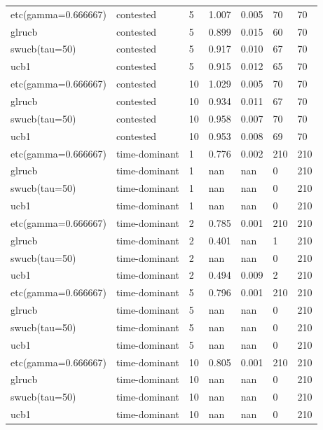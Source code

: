 \begin{tabular}{lllllll}
etc(gamma=0.666667) & contested & 5 & 1.007 & 0.005 & 70 & 70 \\
glrucb & contested & 5 & 0.899 & 0.015 & 60 & 70 \\
swucb(tau=50) & contested & 5 & 0.917 & 0.010 & 67 & 70 \\
ucb1 & contested & 5 & 0.915 & 0.012 & 65 & 70 \\
etc(gamma=0.666667) & contested & 10 & 1.029 & 0.005 & 70 & 70 \\
glrucb & contested & 10 & 0.934 & 0.011 & 67 & 70 \\
swucb(tau=50) & contested & 10 & 0.958 & 0.007 & 70 & 70 \\
ucb1 & contested & 10 & 0.953 & 0.008 & 69 & 70 \\
etc(gamma=0.666667) & time-dominant & 1 & 0.776 & 0.002 & 210 & 210 \\
glrucb & time-dominant & 1 & nan & nan & 0 & 210 \\
swucb(tau=50) & time-dominant & 1 & nan & nan & 0 & 210 \\
ucb1 & time-dominant & 1 & nan & nan & 0 & 210 \\
etc(gamma=0.666667) & time-dominant & 2 & 0.785 & 0.001 & 210 & 210 \\
glrucb & time-dominant & 2 & 0.401 & nan & 1 & 210 \\
swucb(tau=50) & time-dominant & 2 & nan & nan & 0 & 210 \\
ucb1 & time-dominant & 2 & 0.494 & 0.009 & 2 & 210 \\
etc(gamma=0.666667) & time-dominant & 5 & 0.796 & 0.001 & 210 & 210 \\
glrucb & time-dominant & 5 & nan & nan & 0 & 210 \\
swucb(tau=50) & time-dominant & 5 & nan & nan & 0 & 210 \\
ucb1 & time-dominant & 5 & nan & nan & 0 & 210 \\
etc(gamma=0.666667) & time-dominant & 10 & 0.805 & 0.001 & 210 & 210 \\
glrucb & time-dominant & 10 & nan & nan & 0 & 210 \\
swucb(tau=50) & time-dominant & 10 & nan & nan & 0 & 210 \\
ucb1 & time-dominant & 10 & nan & nan & 0 & 210 \\
\bottomrule
\end{tabular}

